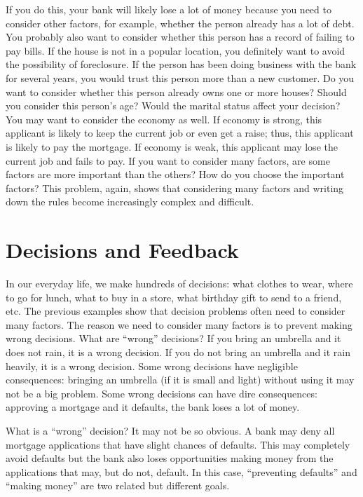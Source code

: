 If you do this, your bank will likely lose a lot of money because you
need to consider other factors, for example, whether the person
already has a lot of debt. You probably also want to consider whether
this person has a record of failing to pay bills.  If the house is not
in a popular location, you definitely want to avoid the possibility of
foreclosure. If the person has been doing business with the bank for
several years, you would trust this person more than a new customer.
Do you want to consider whether this person already owns one or more
houses?  Should you consider this person's age?  Would the marital
status affect your decision?  You may want to consider the economy as
well. If economy is strong, this applicant is likely to keep the
current job or even get a raise; thus, this applicant is likely to pay
the mortgage. If economy is weak, this applicant may lose the current
job and fails to pay.  If you want to consider many factors, are some
factors are more important than the others? How do you choose the
important factors?  This problem, again, shows that considering many
factors and writing down the rules become increasingly complex and
difficult.

\section{Decisions and Feedback}

In our everyday life, we make hundreds of decisions: what clothes to
wear, where to go for lunch, what to buy in a store, what birthday
gift to send to a friend, etc.  The previous examples show that
decision problems often need to consider many factors.  The reason we
need to consider many factors is to prevent making wrong decisions.
What are ``wrong'' decisions? If you bring an umbrella and it does not
rain, it is a wrong decision.  If you do not bring an umbrella and it
rain heavily, it is a wrong decision.  Some wrong decisions have
negligible consequences: bringing an umbrella (if it is small and
light) without using it may not be a big problem.  Some wrong
decisions can have dire consequences: approving a mortgage and it
defaults, the bank loses a lot of money.

What is a ``wrong'' decision? It may not be so obvious.  A bank may
deny all mortgage applications that have slight chances of
defaults. This may completely avoid defaults but the bank also loses
opportunities making money from the applications that may, but do not,
default.  In this case, ``preventing defaults'' and ``making money''
are two related but different goals.

